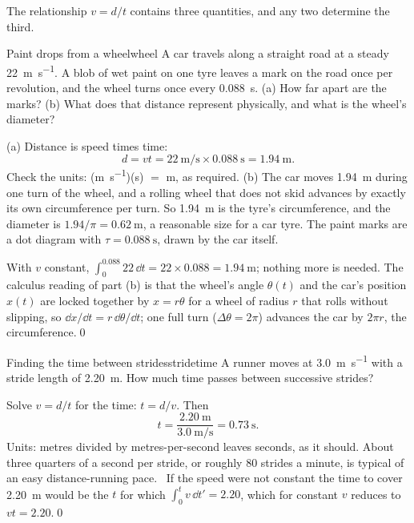 The relationship $v = d/t$ contains three quantities, and any two determine the third.

\begin{example}{Paint drops from a wheel}{wheel}
A car travels along a straight road at a steady \SI{22}{\metre\per\second}. A blob of wet paint on one tyre leaves a mark on the road once per revolution, and the wheel turns once every \SI{0.088}{\second}. (a) How far apart are the marks? (b) What does that distance represent physically, and what is the wheel's diameter?

\elem (a) Distance is speed times time:
\[
d = vt = \SI{22}{\metre\per\second} \times \SI{0.088}{\second} = \SI{1.94}{\metre}.
\]
Check the units: (\si{\metre\per\second})(\si{\second}) $=$ \si{\metre}, as required. (b) The car moves \SI{1.94}{\metre} during one turn of the wheel, and a rolling wheel that does not skid advances by exactly its own circumference per turn. So \SI{1.94}{\metre} is the tyre's circumference, and the diameter is $1.94/\pi = \SI{0.62}{\metre}$, a reasonable size for a car tyre. The paint marks are a dot diagram with $\tau = \SI{0.088}{\second}$, drawn by the car itself.

\calc With $v$ constant, $\int_{0}^{0.088} 22\,\dd t = 22 \times 0.088 = \SI{1.94}{\metre}$; nothing more is needed. The calculus reading of part (b) is that the wheel's angle $\theta(t)$ and the car's position $x(t)$ are locked together by $x = r\theta$ for a wheel of radius $r$ that rolls without slipping, so $\dd x/\dd t = r\,\dd\theta/\dd t$; one full turn ($\Delta\theta = 2\pi$) advances the car by $2\pi r$, the circumference.\qed
\end{example}

\begin{example}{Finding the time between strides}{stridetime}
A runner moves at \SI{3.0}{\metre\per\second} with a stride length of \SI{2.20}{\metre}. How much time passes between successive strides?

\solution Solve $v = d/t$ for the time: $t = d/v$. Then
\[
t = \frac{\SI{2.20}{\metre}}{\SI{3.0}{\metre\per\second}} = \SI{0.73}{\second}.
\]
Units: metres divided by metres-per-second leaves seconds, as it should. About three quarters of a second per stride, or roughly \num{80} strides a minute, is typical of an easy distance-running pace. \calctag\ If the speed were not constant the time to cover \SI{2.20}{\metre} would be the $t$ for which $\int_0^t v\,\dd t' = 2.20$, which for constant $v$ reduces to $vt = 2.20$.\qed
\end{example}

